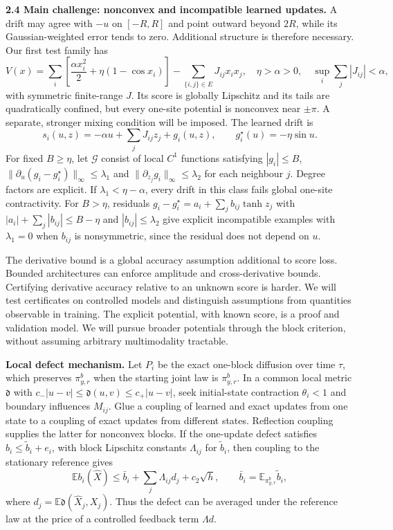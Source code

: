\documentclass[12pt,a4paper]{article}
\newcommand{\E}{\mathbb E}
\newcommand{\pir}{\pi_{y,r}^{b}}
\begin{document}
\textbf{2.4 Main challenge: nonconvex and incompatible learned updates.}
A drift may agree with $-u$ on $[-R,R]$ and point outward beyond $2R$, while its Gaussian-weighted error tends to zero. Additional structure is therefore necessary. Our first test family has
\begin{equation}\label{eq:potential}
 V(x)=\sum_i\left[\frac{\alpha x_i^2}{2}+\eta(1-\cos x_i)\right]
 -\sum_{\{i,j\}\in E}J_{ij}x_ix_j,
 \quad \eta>\alpha>0,\quad\sup_i\sum_j|J_{ij}|<\alpha,
\end{equation}
with symmetric finite-range $J$. Its score is globally Lipschitz and its tails are quadratically confined, but every one-site potential is nonconvex near $\pm\pi$. A separate, stronger mixing condition will be imposed. The learned drift is
\[
 s_i(u,z)=-\alpha u+\sum_jJ_{ij}z_j+g_i(u,z),\qquad
 g_i^\star(u)=-\eta\sin u.
\]
For fixed $B\geq\eta$, let $\mathcal G$ consist of local $C^1$ functions satisfying $|g_i|\leq B$, $\|\partial_u(g_i-g_i^\star)\|_\infty\leq\lambda_1$ and $\|\partial_{z_j}g_i\|_\infty\leq\lambda_2$ for each neighbour $j$. Degree factors are explicit. If $\lambda_1<\eta-\alpha$, every drift in this class fails global one-site contractivity. For $B>\eta$, residuals $g_i-g_i^\star=a_i+\sum_j b_{ij}\tanh z_j$ with $|a_i|+\sum_j|b_{ij}|\leq B-\eta$ and $|b_{ij}|\leq\lambda_2$ 
give explicit incompatible examples with $\lambda_1=0$ when $b_{ij}$ is nonsymmetric, since the residual does not depend on $u$.

The derivative bound is a global accuracy assumption additional to score loss. Bounded architectures can enforce amplitude and cross-derivative bounds. Certifying derivative accuracy relative to an unknown score is harder. We will test certificates on controlled models and distinguish assumptions from quantities observable in training. The explicit potential, with known score, is a proof and validation model. We will pursue broader potentials through the block criterion, without assuming arbitrary multimodality tractable.

\textbf{Local defect mechanism.} Let $P_i$ be the exact one-block diffusion over time $\tau$, which preserves $\pir$ when the starting joint law is $\pir$. In a common local metric $\mathfrak d$ with $c_-|u-v|\leq\mathfrak d(u,v)\leq c_+|u-v|$, seek initial-state contraction $\theta_i<1$ and boundary influences $M_{ij}$. Glue a coupling of learned and exact updates from one state to a coupling of exact updates from different states. Reflection coupling supplies the latter for nonconvex blocks. If the one-update defect satisfies $b_i\leq\widetilde b_i+e_i$, with block Lipschitz constants $\Lambda_{ij}$ for $\widetilde b_i$, then coupling to the stationary reference gives
\[
 \E b_i(\widehat X)\leq\bar b_i+\sum_j\Lambda_{ij}d_j+c_2\sqrt h,
 \qquad \bar b_i=\E_{\pir}\widetilde b_i,
\]
where $d_j=\E\mathfrak d(\widehat X_j,X_j)$. Thus the defect can be averaged under the reference law at the price of a controlled feedback term $\Lambda d$.
\end{document}
